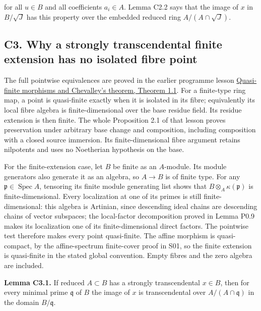 \documentclass[11pt,a4paper,openany]{report}
\begin{document}
for all \(u\in B\) and all coefficients \(a_i\in A\). Lemma C2.2 says that the image of \(x\) in \(B/\sqrt J\) has this property over the embedded reduced ring \(A/(A\cap\sqrt J)\).

\subsection{C3. Why a strongly transcendental finite extension has no isolated fibre point}\label{AG-RG-S04-c3.-why-a-strongly-transcendental-finite-extension-has-no-isolated-fibre-point}

The full pointwise equivalences are proved in the earlier programme lesson \href{https://github.com/KokunoYumeto/open-math-courses/blob/d02d0a3669f42579db037cd44de1d113fdd770a1/docs/courses/AG-MO/src/quasi-finite-morphisms-and-chevalley.md}{Quasi-finite morphisms and Chevalley's theorem, Theorem 1.1}. For a finite-type ring map, a point is quasi-finite exactly when it is isolated in its fibre; equivalently its local fibre algebra is finite-dimensional over the base residue field. Its residue extension is then finite. The whole Proposition 2.1 of that lesson proves preservation under arbitrary base change and composition, including composition with a closed source immersion. Its finite-dimensional fibre argument retains nilpotents and uses no Noetherian hypothesis on the base.

For the finite-extension case, let \(B\) be finite as an \(A\)-module. Its module generators also generate it as an algebra, so \(A\to B\) is of finite type. For any \(\mathfrak p\in\operatorname{Spec}A\), tensoring its finite module generating list shows that \(B\otimes_A\kappa(\mathfrak p)\) is finite-dimensional. Every localization at one of its primes is still finite-dimensional: this algebra is Artinian, since descending ideal chains are descending chains of vector subspaces; the local-factor decomposition proved in Lemma P0.9 makes its localization one of its finite-dimensional direct factors. The pointwise test therefore makes every point quasi-finite. The affine morphism is quasi-compact, by the affine-spectrum finite-cover proof in S01, so the finite extension is quasi-finite in the stated global convention. Empty fibres and the zero algebra are included.

\textbf{Lemma C3.1.} If reduced \(A\subset B\) has a strongly transcendental \(x\in B\), then for every minimal prime \(\mathfrak q\) of \(B\) the image of \(x\) is transcendental over \(A/(A\cap\mathfrak q)\) in the domain \(B/\mathfrak q\).
\end{document}
